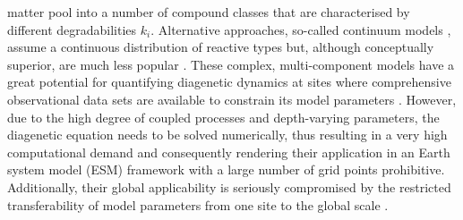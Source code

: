 \documentclass[gmd, manuscript]{copernicus}
\begin{document}
matter pool into a number of compound classes that are characterised by different degradabilities $k_i$.
Alternative approaches, so-called continuum models \citep{middelburg_simple_1989, boudreau_reactive_1991}, assume a continuous distribution of reactive types but, although conceptually superior, are much less popular \citep{arndt_quantifying_2013}. 
These complex, multi-component models have a great potential for quantifying diagenetic dynamics at sites where comprehensive observational data sets are available to constrain its model 
parameters \citep[see e.g.][for applications]{boudreau_comparative_1998, wang_multicomponent_1996, thullner_global_scale_2009}. 
However, due to the high degree of coupled processes and depth-varying parameters, the diagenetic equation needs to be %
solved numerically, thus resulting in a very high computational demand and consequently rendering their application in an Earth system model (ESM) framework with a large number of grid points prohibitive. 
Additionally, their global applicability is seriously compromised by the restricted transferability of model parameters from one site to the global scale \citep{arndt_quantifying_2013}. 
\end{document}
